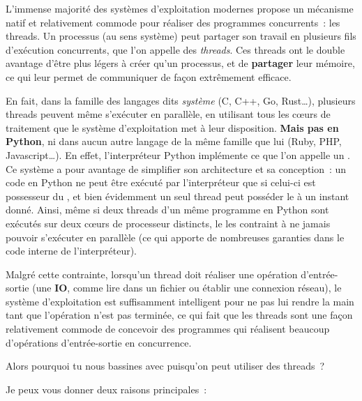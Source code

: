\documentclass[small]{zmdocument}
\begin{document}


L’immense majorité des systèmes d’exploitation modernes propose un mécanisme natif et relativement commode pour réaliser des programmes concurrents : les threads. Un processus (au sens système) peut partager son travail en plusieurs fils d’exécution concurrents, que l’on appelle des \textit{threads}. Ces threads ont le double avantage d’être plus légers à créer qu’un processus, et de \textbf{partager} leur mémoire, ce qui leur permet de communiquer de façon extrêmement efficace.



En fait, dans la famille des langages dits \textit{système} (C, C++, Go, Rust…), plusieurs threads peuvent même s’exécuter en parallèle, en utilisant tous les cœurs de traitement que le système d’exploitation met à leur disposition. \textbf{Mais pas en Python}, ni dans aucun autre langage de la même famille que lui (Ruby, PHP, Javascript…). En effet, l’interpréteur Python implémente ce que l’on appelle un . Ce système a pour avantage de simplifier son architecture et sa conception : un code en Python ne peut être exécuté par l’interpréteur que si celui-ci est possesseur du , et bien évidemment un seul thread peut posséder le  à un instant donné. Ainsi, même si deux threads d’un même programme en Python sont exécutés sur deux cœurs de processeur distincts, le  les contraint à ne jamais pouvoir s’exécuter en parallèle (ce qui apporte de nombreuses garanties dans le code interne de l’interpréteur).



Malgré cette contrainte, lorsqu’un thread doit réaliser une opération d’entrée-sortie (une \textbf{IO}, comme lire dans un fichier ou établir une connexion réseau), le système d’exploitation est suffisamment intelligent pour ne pas lui rendre la main tant que l’opération n’est pas terminée, ce qui fait que les threads sont une façon relativement commode de concevoir des programmes qui réalisent beaucoup d’opérations d’entrée-sortie en concurrence.



\begin{Question}
Alors pourquoi tu nous bassines avec  puisqu’on peut utiliser des threads ?
\end{Question}


Je peux vous donner deux raisons principales :
\end{document}
